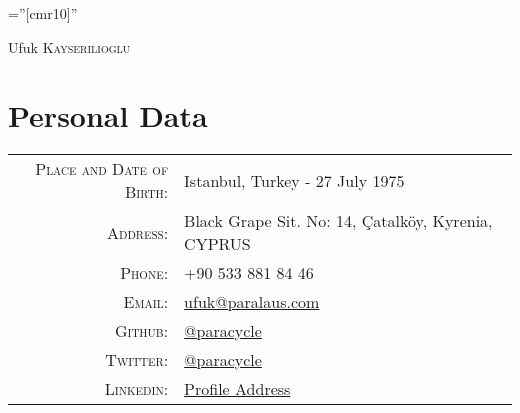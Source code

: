 \documentclass[a4paper,10pt]{article}
\begin{document}
\pagestyle{empty} %

\font\fb=''[cmr10]'' %

\par{\centering
		{\Huge Ufuk \textsc{Kayserilioglu}
	}\bigskip\par}

\section{Personal Data}

\begin{tabular}{rl}
    \textsc{Place and Date of Birth:} & Istanbul, Turkey  - 27 July 1975 \\
    \textsc{Address:}                 & Black Grape Sit. No: 14, Çatalköy, Kyrenia, CYPRUS \\
    \textsc{Phone:}                   & +90 533 881 84 46 \\
    \textsc{Email:}                   & \href{mailto:ufuk@paralaus.com}{ufuk@paralaus.com} \\
    \textsc{Github:}                  & \href{https://github.com/paracycle}{@paracycle} \\
    \textsc{Twitter:}                 & \href{https://twitter.com/paracycle}{@paracycle} \\
    \textsc{Linkedin:}                & \href{https://www.linkedin.com/in/ufukkayserilioglu}{Profile Address} \\
\end{tabular}

\end{document}
